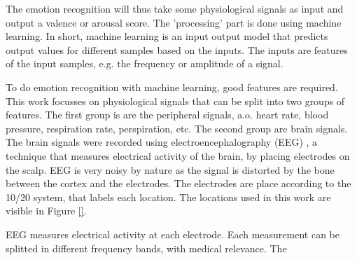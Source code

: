 \npar

The emotion recognition will thus take some physiological signals as input and output a valence or arousal score. The 'processing' part is done using machine learning. In short, machine learning is an input output model that predicts output values for different samples based on the inputs. The inputs are features of the input samples, e.g. the frequency or amplitude of a signal.

\npar

To do emotion recognition with machine learning, good features are required. This work focusses on physiological signals that can be split into two groups of features. The first group is are the peripheral signals, a.o. heart rate, blood pressure, respiration rate, perspiration, etc. The second group are brain signals. The brain signals were recorded using electroencephalography (EEG) %
, a technique that measures electrical activity of the brain, by placing electrodes on the scalp. EEG is very noisy by nature as the signal is distorted by the bone between the cortex and the electrodes. The electrodes are place according to the 10/20 system, that labels each location. The locations used in this work are visible in Figure \ref{}.


EEG measures electrical activity at each electrode. Each measurement can be splitted in different frequency bands, with medical relevance. The 





